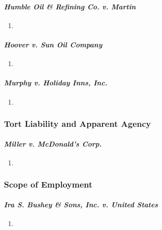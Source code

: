 \paragraph{\emph{Humble Oil \& Refining Co. v. Martin}}

\begin{enumerate}
    \item %
\end{enumerate}

\paragraph{\emph{Hoover v. Sun Oil Company}}

\begin{enumerate}
    \item %
\end{enumerate}

\paragraph{\emph{Murphy v. Holiday Inns, Inc.}}

\begin{enumerate}
    \item %
\end{enumerate}

\subsubsection{Tort Liability and Apparent Agency}

\paragraph{\emph{Miller v. McDonald's Corp.}}

\begin{enumerate}
    \item %
\end{enumerate}

\subsubsection{Scope of Employment}

\paragraph{\emph{Ira S. Bushey \& Sons, Inc. v. United States}}

\begin{enumerate}
    \item %
\end{enumerate}


